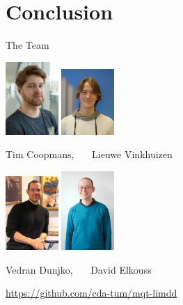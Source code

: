 \section{Conclusion}

\begin{refsection}
\begin{frame}{The Team}

\centering

\vspace{-2em}


\includegraphics[width=2cm]{graphics/coopmans_tim}
\includegraphics[width=2cm]{graphics/lieuwe}


\vspace{-.5em}
Tim Coopmans,~~~  Lieuwe Vinkhuizen


\includegraphics[width=2cm]{graphics/vedran-jobs}
\includegraphics[width=2cm]{graphics/elkouss-david-20211227-torso_0}

\vspace{-.5em}
Vedran Dunjko,~~~   David Elkouss



\vspace{-2em}


\printbibliography[section=\therefsection]

\centering
\vspace{-1em}
\url{https://github.com/cda-tum/mqt-limdd}

\end{frame}
\end{refsection}

